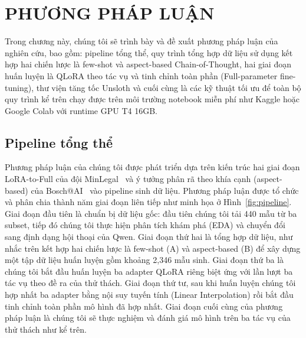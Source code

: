 \chapter{PHƯƠNG PHÁP LUẬN}

Trong chương này, chúng tôi sẽ trình bày và đề xuất phương pháp luận của nghiên cứu, bao gồm: pipeline tổng thể, quy trình tổng hợp dữ liệu sử dụng kết hợp hai chiến lược là few-shot và aspect-based Chain-of-Thought, hai giai đoạn huấn luyện là QLoRA theo tác vụ và tinh chỉnh toàn phần (Full-parameter fine-tuning), thư viện tăng tốc Unsloth và cuối cùng là các kỹ thuật tối ưu để toàn bộ quy trình kể trên chạy được trên môi trường notebook miễn phí như Kaggle hoặc Google Colab với runtime GPU T4 16GB.

\section{Pipeline tổng thể}

Phương pháp luận của chúng tôi được phát triển dựa trên kiến trúc hai giai đoạn LoRA-to-Full của đội MinLegal~\cite{luan2025minlegal} và ý tưởng phân rã theo khía cạnh (aspect-based) của Bosch@AI~\cite{quang2025bosch} vào pipeline sinh dữ liệu. Phương pháp luận được tổ chức và phân chia thành năm giai đoạn liên tiếp như minh họa ở Hình~\ref{fig:pipeline}. Giai đoạn đầu tiên là chuẩn bị dữ liệu gốc: đầu tiên chúng tôi tải 440 mẫu từ ba subset, tiếp đó chúng tôi thực hiện phân tích khám phá (EDA) và chuyển đổi sang định dạng hội thoại của Qwen. Giai đoạn thứ hai là tổng hợp dữ liệu, như nhắc trên kết hợp hai chiến lược là few-shot (A) và aspect-based (B) để xây dựng một tập dữ liệu huấn luyện gồm khoảng 2,346 mẫu sinh. Giai đoạn thứ ba là chúng tôi bắt đầu huấn luyện ba adapter QLoRA riêng biệt ứng với lần lượt ba tác vụ theo đề ra của thử thách. Giai đoạn thứ tư, sau khi huấn luyện chúng tôi hợp nhất ba adapter bằng nội suy tuyến tính (Linear Interpolation) rồi bắt đầu tinh chỉnh toàn phần mô hình đã hợp nhất. Giai đoạn cuối cùng của phương pháp luận là chúng tôi sẽ thực nghiệm và đánh giá mô hình trên ba tác vụ của thử thách như kể trên.

